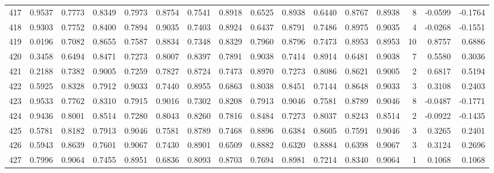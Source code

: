 \begin{tabular}{lrrrrrrrrrrrrrrr}
417 &      0.9537 &  0.7773 &  0.8349 &  0.7973 &  0.8754 &  0.7541 &  0.8918 &  0.6525 &  0.8938 &  0.6440 &   0.8767 &     0.8938 &      8 &                   -0.0599 &                    -0.1764 \\
418 &      0.9303 &  0.7752 &  0.8400 &  0.7894 &  0.9035 &  0.7403 &  0.8924 &  0.6437 &  0.8791 &  0.7486 &   0.8975 &     0.9035 &      4 &                   -0.0268 &                    -0.1551 \\
419 &      0.0196 &  0.7082 &  0.8655 &  0.7587 &  0.8834 &  0.7348 &  0.8329 &  0.7960 &  0.8796 &  0.7473 &   0.8953 &     0.8953 &     10 &                    0.8757 &                     0.6886 \\
420 &      0.3458 &  0.6494 &  0.8471 &  0.7273 &  0.8007 &  0.8397 &  0.7891 &  0.9038 &  0.7414 &  0.8914 &   0.6481 &     0.9038 &      7 &                    0.5580 &                     0.3036 \\
421 &      0.2188 &  0.7382 &  0.9005 &  0.7259 &  0.7827 &  0.8724 &  0.7473 &  0.8970 &  0.7273 &  0.8086 &   0.8621 &     0.9005 &      2 &                    0.6817 &                     0.5194 \\
422 &      0.5925 &  0.8328 &  0.7912 &  0.9033 &  0.7440 &  0.8955 &  0.6863 &  0.8038 &  0.8451 &  0.7144 &   0.8648 &     0.9033 &      3 &                    0.3108 &                     0.2403 \\
423 &      0.9533 &  0.7762 &  0.8310 &  0.7915 &  0.9016 &  0.7302 &  0.8208 &  0.7913 &  0.9046 &  0.7581 &   0.8789 &     0.9046 &      8 &                   -0.0487 &                    -0.1771 \\
424 &      0.9436 &  0.8001 &  0.8514 &  0.7280 &  0.8043 &  0.8260 &  0.7816 &  0.8484 &  0.7273 &  0.8037 &   0.8243 &     0.8514 &      2 &                   -0.0922 &                    -0.1435 \\
425 &      0.5781 &  0.8182 &  0.7913 &  0.9046 &  0.7581 &  0.8789 &  0.7468 &  0.8896 &  0.6384 &  0.8605 &   0.7591 &     0.9046 &      3 &                    0.3265 &                     0.2401 \\
426 &      0.5943 &  0.8639 &  0.7601 &  0.9067 &  0.7430 &  0.8901 &  0.6509 &  0.8882 &  0.6320 &  0.8884 &   0.6398 &     0.9067 &      3 &                    0.3124 &                     0.2696 \\
427 &      0.7996 &  0.9064 &  0.7455 &  0.8951 &  0.6836 &  0.8093 &  0.8703 &  0.7694 &  0.8981 &  0.7214 &   0.8340 &     0.9064 &      1 &                    0.1068 &                     0.1068 \\

\end{tabular}
